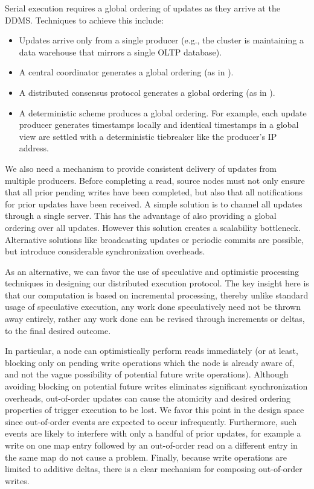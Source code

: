 Serial execution requires a global ordering of updates as they arrive at
the DDMS. Techniques to achieve this include:
\begin{itemize}
\item Updates arrive only from a single producer (e.g., the cluster is
maintaining a data warehouse that mirrors a single OLTP database).
\item A central coordinator generates a global ordering (as in
\cite{peng-incremental:10}).
\item A distributed consensus protocol generates a global ordering (as in
\cite{Junqueira:2009:LTZ:1582716.1582721}).
\item A deterministic scheme produces a global ordering. For example, each
update producer generates timestamps locally and identical timestamps in a
global view are settled with a deterministic tiebreaker like the producer's IP
address.
\end{itemize}

We also need a mechanism to provide consistent delivery of updates from multiple
producers. Before completing a read, source nodes must not only ensure that all
prior pending writes have been completed, but also that all notifications for
prior updates have been received.
A simple solution is to channel all updates through a single server. This has
the advantage of also providing a global ordering over all updates.  However
this solution creates a scalability bottleneck.  Alternative solutions like
broadcasting updates or periodic commits are possible, but introduce
considerable synchronization overheads.

As an alternative, we can favor the use of speculative and optimistic processing
techniques in designing our distributed execution protocol. The key insight here
is that our computation is based on incremental processing, thereby unlike
standard usage of speculative execution, any work done speculatively need not be
thrown away entirely, rather any work done can be revised through increments or
deltas, to the final desired outcome.

In particular, a node can optimistically perform reads immediately (or at least,
blocking only on pending write operations which the node
is already aware of, and not the vague possibility of potential future write
operations).  Although avoiding blocking on potential future writes eliminates
significant synchronization overheads, out-of-order updates can cause the
atomicity and desired ordering properties of trigger execution to be lost.
We favor this point in the design space since out-of-order events are expected
to occur infrequently. Furthermore, such events are likely to interfere with
only a handful of prior updates, for example a write on one map entry followed
by an out-of-order read on a different entry in the same map do not cause a
problem. Finally, because write operations are limited to additive deltas,
there is a clear mechanism for composing out-of-order writes.

